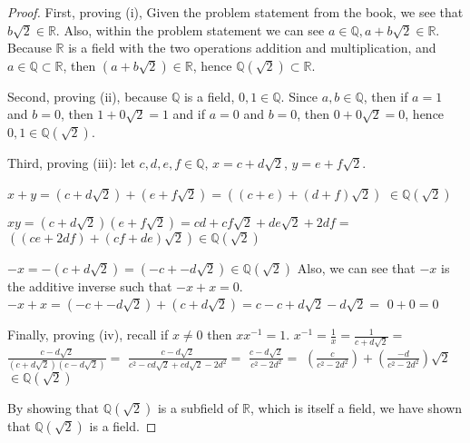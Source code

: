 \documentclass[a4paper]{article}
\begin{document}
\begin{myparindent}{0pt}
\begin{proof}
  First, proving (i), Given the problem statement from the book, we see that $b \sqrt{2} \in \mathbb{R}$.
  Also, within the problem statement we can see $a \in \mathbb{Q}, a + b \sqrt{2} \in \mathbb{R}$.
  Because $\mathbb{R}$ is a field with the two operations addition and multiplication,
  and $a \in \mathbb{Q} \subset \mathbb{R}$, then $(a + b\sqrt{2}) \in \mathbb{R}$,
  hence $\mathbb{Q}(\sqrt{2}) \subset \mathbb{R}$. \newline

  Second, proving (ii), because $\mathbb{Q}$ is a field, $0, 1 \in \mathbb{Q}$.
  Since $a, b \in \mathbb{Q}$, then if $a = 1$ and $b = 0$, then
  $1 + 0 \sqrt{2} = 1$ and if $a = 0$ and $b = 0$, then $0 + 0 \sqrt{2} = 0$,
  hence $0, 1 \in \mathbb{Q}(\sqrt{2})$. \newline

  Third, proving (iii): let $c, d, e, f \in \mathbb{Q}$, $x = c + d \sqrt{2}$,
  $y = e + f \sqrt{2}$. \newline

    $x + y = (c + d \sqrt{2}) + (e + f \sqrt{2}) = ((c + e) + (d + f) \sqrt{2})$
    $\in \mathbb{Q}(\sqrt{2})$ \newline

    $xy = (c + d \sqrt{2})(e + f \sqrt{2}) = cd + cf \sqrt{2} + de \sqrt{2} + 2df =$ \newline
    $((ce + 2df) + (cf + de) \sqrt{2}) \in \mathbb{Q}(\sqrt{2})$ \newline

    $-x = -(c + d \sqrt{2}) = (-c + -d \sqrt{2}) \in \mathbb{Q}(\sqrt{2})$ \newline
    Also, we can see that $-x$ is the additive inverse such that $-x + x = 0$. \newline
    $-x + x = (-c + -d \sqrt{2}) + (c + d \sqrt{2}) = c - c + d \sqrt{2} - d \sqrt{2} =$
    $0 + 0 = 0$ \newline

    Finally, proving (iv), recall if $x \ne 0$ then $xx^{-1} = 1$. \newline
    $x^{-1} = \frac{1}{x} = \frac{1}{c + d \sqrt{2}} = $
    $\frac{c - d \sqrt{2}}{(c + d \sqrt{2})(c - d \sqrt{2})} =$
    $\frac{c - d \sqrt{2}}{c^2 - cd \sqrt{2} + cd \sqrt{2} - 2d^2} =$
    $\frac{c - d \sqrt{2}}{c^2 - 2d^2} =$ \newline
    $(\frac{c}{c^2 - 2 d^2}) + (\frac{-d}{c^2 - 2d^2}) \sqrt{2}$
    $\in \mathbb{Q}(\sqrt{2})$ \newline

    By showing that $\mathbb{Q}(\sqrt{2})$ is a subfield of $\mathbb{R}$,
    which is itself a field, we have shown that $\mathbb{Q}(\sqrt{2})$ is a
    field.


\end{proof}
\end{myparindent}
\end{document}
